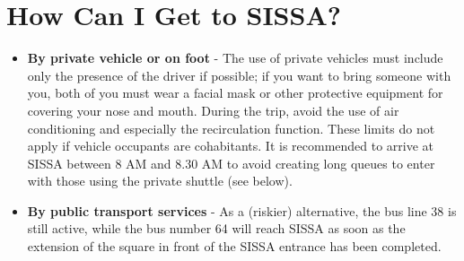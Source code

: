 \documentclass{sissavademecum}
\begin{document}
\section{How Can I Get to SISSA?}

\begin{itemize}
	\item \textbf{By private vehicle or on foot} - The use of private vehicles must include only the presence of the driver if possible; if you want to bring someone with you, both of you must wear a facial mask or other protective equipment for covering your nose and mouth. During the trip, avoid the use of air conditioning and especially the recirculation function. These limits do not apply if vehicle occupants are cohabitants. It is recommended to arrive at SISSA between 8 AM and 8.30 AM to avoid creating long queues to enter with those using the private shuttle (see below).
	
	
	\item \textbf{By public transport services} - As a (riskier) alternative, the bus line 38 is still active, while the bus number 64 will reach SISSA as soon as the extension of the square in front of the SISSA entrance has been completed.
\end{itemize}
\end{document}
